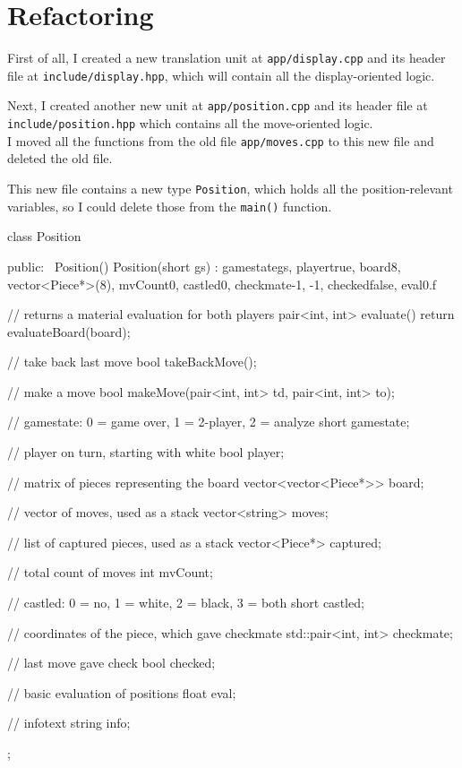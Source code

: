 \section{Refactoring}

First of all, I created a new translation unit at \texttt{app/display.cpp} and its
header file at \texttt{include/display.hpp}, which will contain all the display-oriented logic.

Next, I created another new unit at \texttt{app/position.cpp} and its header file at\\
\texttt{include/position.hpp} which contains all the move-oriented logic.\\
I moved all the functions from the old file \texttt{app/moves.cpp} to this new file and
deleted the old file.

This new file contains a new type \texttt{Position}, which holds all the position-relevant variables,
so I could delete those from the \texttt{main()} function.

\begin{cpp}
class Position {
public:
  ~Position() {}
  Position(short gs) : gamestate{gs}, player{true},
               board{8, vector<Piece*>(8)},
               mvCount{0}, castled{0}, checkmate{-1, -1},
               checked{false}, eval{0.f}
  {}

  // returns a material evaluation for both players
  pair<int, int> evaluate() {
    return evaluateBoard(board);
  }

  // take back last move
  bool takeBackMove();

  // make a move
  bool makeMove(pair<int, int> td, pair<int, int> to);

  // gamestate: 0 = game over, 1 = 2-player, 2 = analyze 
  short gamestate;

  // player on turn, starting with white
  bool player;
  
  // matrix of pieces representing the board
  vector<vector<Piece*>> board;

  // vector of moves, used as a stack
  vector<string> moves;

  // list of captured pieces, used as a stack
  vector<Piece*> captured;

  // total count of moves
  int mvCount;
  
  // castled: 0 = no, 1 = white, 2 = black, 3 = both
  short castled;
  
  // coordinates of the piece, which gave checkmate
  std::pair<int, int> checkmate;
  
  // last move gave check
  bool checked;

  // basic evaluation of positions
  float eval;

  // infotext
  string info;
};
\end{cpp}

